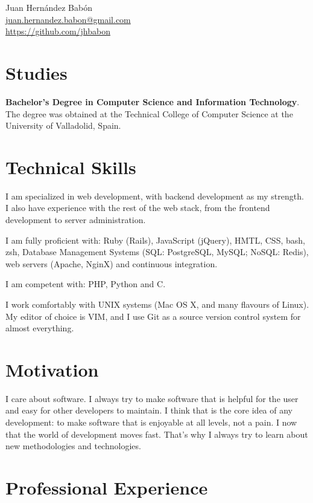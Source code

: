 \documentclass[10pt, a4paper]{article}
\begin{document}
\reversemarginpar
{\LARGE Juan Hernández Babón}\\[0.25cm]
\href{mailto:juan.hernandez.babon@gmail.com}{juan.hernandez.babon@gmail.com}\\
\href{https://github.com/jhbabon}{https://github.com/jhbabon}\\

\section*{Studies}

\textbf{Bachelor's Degree in Computer Science and Information Technology}. The degree was obtained at the Technical College of Computer Science at the University of Valladolid, Spain.

\section*{Technical Skills}

I am specialized in web development, with backend development as my strength. I also have experience with the rest of the web stack, from the frontend development to server administration.

I am fully proficient with: Ruby (Rails), JavaScript (jQuery), HMTL, CSS, bash, zsh, Database Management Systems (SQL: PostgreSQL, MySQL; NoSQL: Redis), web servers (Apache, NginX) and continuous integration.

I am competent with: PHP, Python and C.

I work comfortably with UNIX systems (Mac OS X, and many flavours of Linux). My editor of choice is VIM, and I use Git as a source version control system for almost everything.

\section*{Motivation}

I care about software. I always try to make software that is helpful for the user and easy for other developers to maintain. I think that is the core idea of any development: to make software that is enjoyable at all levels, not a pain. I now that the world of development moves fast. That's why I always try to learn about new methodologies and technologies.

\section*{Professional Experience}
\end{document}

